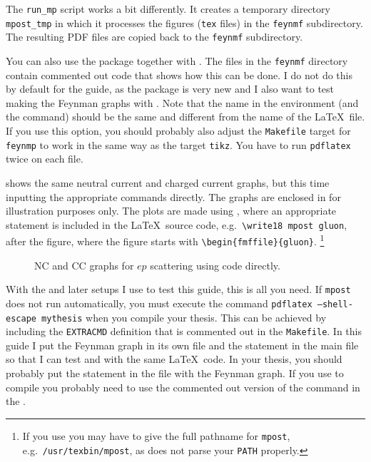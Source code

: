 The \texttt{run\_mp} script works a bit differently. It creates a
temporary directory \texttt{mpost\_tmp} in which it processes the
figures (\texttt{tex} files) in the \texttt{feynmf} subdirectory. The
resulting PDF files are copied back to the \texttt{feynmf}
subdirectory.

You can also use the package  together with
. The files in the \texttt{feynmf} directory contain
commented out code that shows how this can be done. I do not do this
by default for the guide, as the package is very new and I also want
to test making the Feynman graphs with . Note that
the name in the  environment (and the 
command) should be the same and different from the name of the \LaTeX\
file. If you use this option, you should probably also adjust the
\texttt{Makefile} target for \texttt{feynmp} to work in the same way
as the target \texttt{tikz}. You have to run \texttt{pdflatex} twice
on each file.

 shows the same neutral current and
charged current graphs, but this time inputting the appropriate
 commands directly. The graphs are enclosed in
 for illustration purposes only.
The plots are made using ,
where an appropriate
 statement is included in the \LaTeX\ source code,
e.g.\ \verb+\write18 mpost gluon+, after the figure, where the figure
starts with \verb+\begin{fmffile}{gluon}+.%
\footnote{If you use \TeXstudio you may have to give the full pathname for \texttt{mpost},
  e.g.\ \texttt{/usr/texbin/mpost}, as \TeXstudio does not parse your \texttt{PATH} properly.}

\begin{figure}[htbp]
  \centering
  \fbox{}
  \qquad
  \fbox{}
  \caption{NC and CC graphs for $ep$ scattering using 
    code directly.}%
  \label{fig:nccc-feynmf}
\end{figure}

With the  and later setups I use to test this guide,
this is all you need. If \texttt{mpost} does not run automatically,
you must execute the command
\texttt{pdflatex --shell-escape mythesis} when you compile your thesis.
This can be achieved by
including the \texttt{EXTRACMD} definition that is commented out in
the \texttt{Makefile}.
In this guide I put the Feynman graph in its
own file and the  statement in the main file so that
I can test \Package{feynmf} and \Package{feynmp} with the same
\LaTeX\ code. In your thesis, you should probably put the
 statement in the file with the Feynman graph.
If you use  to compile you probably need to use 
the commented out version of the \Command{latexmk} command in the \File{Makefile}.

